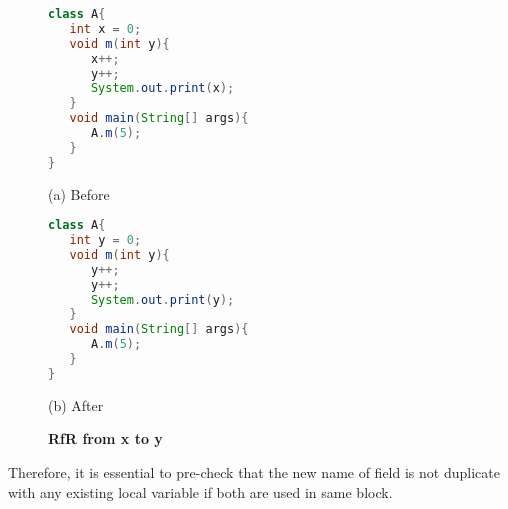\begin{figure}[th]
\centering
\begin{minipage}[t]{0.45\linewidth}
\begin{lstlisting}[language=java, basicstyle=\scriptsize\ttfamily,frame=single]
class A{
   int x = 0;
   void m(int y){
      x++;
      y++;
      System.out.print(x);
   }
   void main(String[] args){
      A.m(5);
   }
}
\end{lstlisting}
\centering(a) Before
\end{minipage}
\hfill
\begin{minipage}[t]{0.45\linewidth}
\begin{lstlisting}[language=java, basicstyle=\scriptsize\ttfamily,frame=single]
class A{
   int y = 0;
   void m(int y){
      y++;
      y++;
      System.out.print(y);
   }
   void main(String[] args){
      A.m(5);
   }
}\end{lstlisting}
\centering(b) After
\end{minipage}
\caption{\textbf{RfR from x to y}}
\label{figure:sameBlock}
\end{figure}

Therefore, it is essential to pre-check that the new name of field is not duplicate with any existing local variable if both are used in same block. 